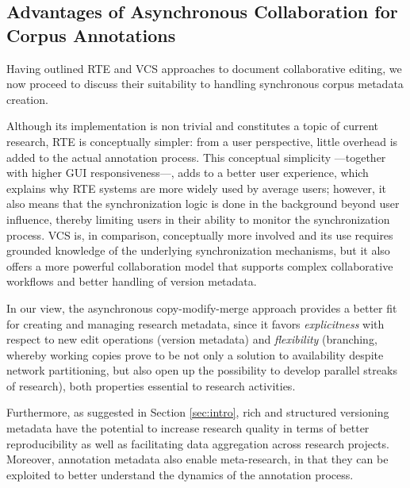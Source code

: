 \documentclass{sig-alternate}
\begin{document}

\subsection{Advantages of Asynchronous Collaboration for Corpus Annotations}
\label{subsec:hybrid}

Having outlined RTE and VCS approaches to document collaborative editing, we now proceed to discuss
their suitability to handling synchronous corpus metadata creation.

Although its implementation is non trivial and constitutes a topic of current research, RTE is
conceptually simpler: from a user perspective, little overhead is added to the actual annotation
process. This conceptual simplicity ---together with higher GUI responsiveness---, adds to
a better user experience, which explains why RTE systems are more widely used by average users;
however, it also means that the synchronization logic is done in the background beyond user
influence, thereby limiting users in their ability to monitor the synchronization process.
VCS is, in comparison, conceptually more involved and its use requires grounded knowledge of the
underlying synchronization mechanisms, but it also offers a more powerful collaboration model that
supports complex collaborative workflows and better handling of version metadata.

In our view, the asynchronous copy-modify-merge approach provides a
better fit for creating and managing research metadata, since it favors \textit{explicitness} with
respect to new edit operations (version metadata) and \textit{flexibility} (branching, whereby
working copies prove to be not only a solution to availability despite network
partitioning, but also open up the possibility to develop parallel streaks of research),
both properties essential to research activities.

Furthermore, as suggested in Section \ref{sec:intro}, rich and structured versioning
metadata have the potential to increase research quality in terms of better reproducibility as
well as facilitating data aggregation across research projects. Moreover, annotation metadata
also enable meta-research, in that they can be exploited to better understand the dynamics of
the annotation process.
\end{document}
